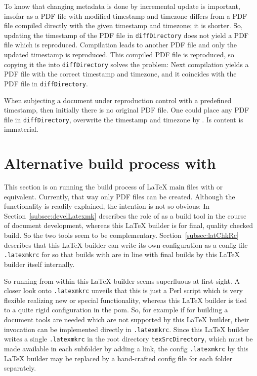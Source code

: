To know that changing metadata is done by incremental update is important, 
insofar as a PDF file with modified timestamp and timezone  
differs from a PDF file compiled directly with the given timestamp and timezone; 
it is shorter. 
So, updating the timestamp of the PDF file in \texttt{diffDirectory} 
does not yield a PDF file which is reproduced. 
Compilation leads to another PDF file and only the updated timestamp is reproduced. 
This compiled PDF file is reproduced, so 
copying it the into \texttt{diffDirectory} solves the problem: 
Next compilation yields a PDF file with the correct timestamp and timezone, 
and it coincides with the PDF file in \texttt{diffDirectory}. 

When subjecting a document under reproduction control with a predefined timestamp, 
then initially there is no original PDF file. 
One could place any PDF file in \texttt{diffDirectory}, 
overwrite the timestamp and timezone by . 
Is content is immaterial. 




\section{Alternative build process with \protect{}}\label{sec:latexmk}%

This section is on running the build process of \LaTeX{} main files 
with  or equivalent. 
Currently, that way only PDF files can be created. 
Although the functionality is readily explained, 
the intention is not so obvious: 
In Section~\ref{subsec:develLatexmk} 
describes the role of  as a build tool 
in the course of document development, 
whereas this \LaTeX{} builder is for final, quality checked build. 
So the two tools seem to be complementary. 
Section~\ref{subsec:latChkRc} describes that this \LaTeX{} builder 
can write its own configuration as 
a config file \texttt{.latexmkrc} for  
so that builds with  are in line 
with final builds by this \LaTeX{} builder itself internally. 

So running  from within this \LaTeX{} builder 
seems superfluous at first sight. 
A closer look onto \texttt{.latexmkrc} unveils that this is just a Perl script 
which is very flexible realizing new or special functionality, 
whereas this \LaTeX{} builder is tied to a quite rigid configuration in the pom. 
So, for example if for building a document tools are needed 
which are not supported by this \LaTeX{} builder, 
their invocation can be implemented directly in \texttt{.latexmkrc}. 
Since this \LaTeX{} builder writes a single \texttt{.latexmkrc} 
in the root directory \texttt{texSrcDirectory}, 
which must be made available in each subfolder by adding a link, 
the config \texttt{.latexmkrc} by this \LaTeX{} builder 
may be replaced by a hand-crafted config file for each folder separately. 

